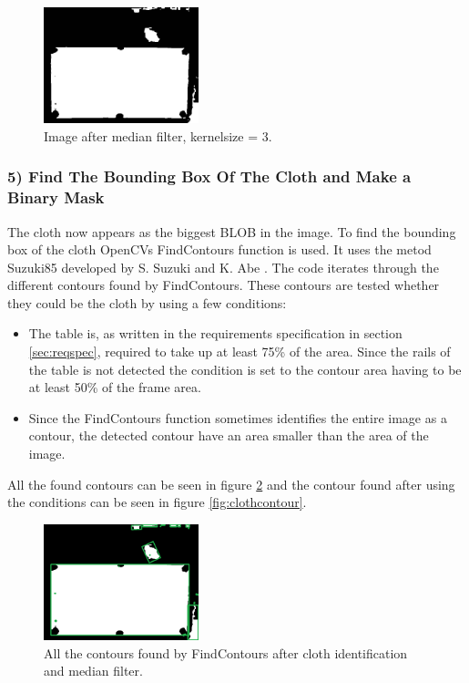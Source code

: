 \begin{figure}[H]
\begin{center}
\leavevmode
\includegraphics[width=0.4\textwidth]{images/afterclothmedian}
\end{center}
\caption{Image after median filter, kernelsize = 3.}
\label{fig:afterclothmedian}
\end{figure}

\subsubsection{5) Find The Bounding Box Of The Cloth and Make a Binary Mask}
The cloth now appears as the biggest BLOB in the image. To find the bounding box of the cloth OpenCVs FindContours function is used. It uses the metod Suzuki85 developed by S. Suzuki and K. Abe \cite{contour}. The code iterates through the different contours found by FindContours. These contours are tested whether they could be the cloth by using a few conditions:

\begin{itemize}
	\item The table is, as written in the requirements specification in section \ref{sec:reqspec}, required to take up at least 75\% of the area. Since the rails of the table is not detected the condition is set to the contour area having to be at least 50\% of the frame area. 
	\item Since the FindContours function sometimes identifies the entire image as a contour, the detected contour have an area smaller than the area of the image.
\end{itemize}

All the found contours can be seen in figure \ref{fig:allcontours} and the contour found after using the conditions can be seen in figure \ref{fig:clothcontour}.
\begin{figure}[H]
\begin{center}
\leavevmode
\includegraphics[width=0.4\textwidth]{images/allcontours}
\end{center}
\caption{All the contours found by FindContours after cloth identification and median filter.}
\label{fig:allcontours}
\end{figure}

